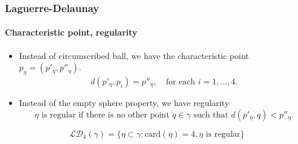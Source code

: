 \documentclass[c, 10pt]{beamer}
\begin{document}
\begin{frame}\frametitle{Laguerre-Delaunay}
	\framesubtitle{Characteristic point, regularity}

	{\footnotesize
	\begin{itemize}
		\item Instead of circumscribed ball, we have the \alert{characteristic point} $p_\eta=(p'_\eta,p''_\eta)$. 
			$$d(p'_\eta,p_i) = p''_\eta,\quad \text{for each } i=1,\dots,4.$$
			\vspace{-2mm}
		\item Instead of the empty sphere property, we have \alert{regularity}
			$$\eta \text{ is regular if there is no other point } q\in \gamma \text{ such that } d(p'_\eta,q)<p''_\eta.$$
	\end{itemize}
}

\vspace{-5mm}


$$\mathcal {LD}_4(\gamma) = \{ \eta \subset \gamma: \mathrm{card}(\eta)=4, \eta \text{ is regular} \}$$

\begin{figure}
    \centering
    \begin{minipage}{0.45\textwidth}
        \centering


\end{minipage}
\end{figure}
\end{frame}
\end{document}
